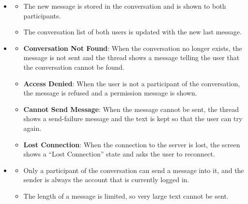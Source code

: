 \begin{itemize}[leftmargin=1.6em,topsep=4pt,itemsep=3pt,parsep=0pt,label=$\bullet$]
        \begin{itemize}[leftmargin=2.2em,topsep=2pt,itemsep=3pt,parsep=0pt,label=$\circ$]
            \item \textbf{Enter Key}: When the user presses the Enter key without holding Shift, the message is sent in the same way as clicking the send button.
            \item \textbf{Empty Message}: When the input box is empty, the send button remains disabled and the user cannot send an empty message.
            \item \textbf{Emoji Only}: When the message contains only emojis, the message is displayed with a larger font in the thread.
        \end{itemize}
    \item {}

        \begin{itemize}[leftmargin=2.2em,topsep=2pt,itemsep=3pt,parsep=0pt,label=$\circ$]
            \item The new message is stored in the conversation and is shown to both participants.
            \item The conversation list of both users is updated with the new last message.
        \end{itemize}
    \item {}

        \begin{itemize}[leftmargin=2.2em,topsep=2pt,itemsep=3pt,parsep=0pt,label=$\circ$]
            \item \textbf{Conversation Not Found}: When the conversation no longer exists, the message is not sent and the thread shows a message telling the user that the conversation cannot be found.
            \item \textbf{Access Denied}: When the user is not a participant of the conversation, the message is refused and a permission message is shown.
            \item \textbf{Cannot Send Message}: When the message cannot be sent, the thread shows a send-failure message and the text is kept so that the user can try again.
            \item \textbf{Lost Connection}: When the connection to the server is lost, the screen shows a ``Lost Connection'' state and asks the user to reconnect.
        \end{itemize}
    \item {}

        \begin{itemize}[leftmargin=2.2em,topsep=2pt,itemsep=3pt,parsep=0pt,label=$\circ$]
            \item Only a participant of the conversation can send a message into it, and the sender is always the account that is currently logged in.
            \item The length of a message is limited, so very large text cannot be sent.
        \end{itemize}
\end{itemize}

